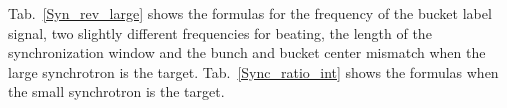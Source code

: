  

Tab.~\ref{Syn_rev_large} shows the formulas for the frequency of the bucket label signal, two slightly different frequencies for beating, the length of the synchronization window and the bunch and bucket center mismatch when the large synchrotron is the target. Tab.~\ref{Sync_ratio_int} shows the formulas when the small synchrotron is the target.
